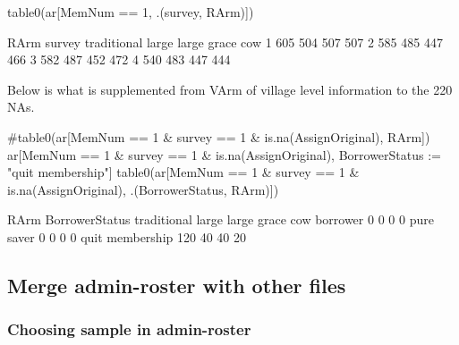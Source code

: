 \begin{Schunk}
\begin{Sinput}
table0(ar[MemNum == 1, .(survey, RArm)])
\end{Sinput}
\begin{Soutput}
      RArm
survey traditional large large grace cow
     1         605   504         507 507
     2         585   485         447 466
     3         582   487         452 472
     4         540   483         447 444
\end{Soutput}
\end{Schunk}
Below is what is supplemented from \textsf{VArm} of village level information to the 220 NAs.
\begin{Schunk}
\begin{Sinput}
#table0(ar[MemNum == 1 & survey == 1 & is.na(AssignOriginal), RArm])
ar[MemNum == 1 & survey == 1 & is.na(AssignOriginal), 
  BorrowerStatus := "quit membership"]
table0(ar[MemNum == 1 & survey == 1 & is.na(AssignOriginal), 
  .(BorrowerStatus, RArm)])
\end{Sinput}
\begin{Soutput}
                 RArm
BorrowerStatus    traditional large large grace cow
  borrower                  0     0           0   0
  pure saver                0     0           0   0
  quit membership         120    40          40  20
\end{Soutput}
\end{Schunk}

\subsection{Merge admin-roster with other files}

\subsubsection{Choosing sample in admin-roster}

